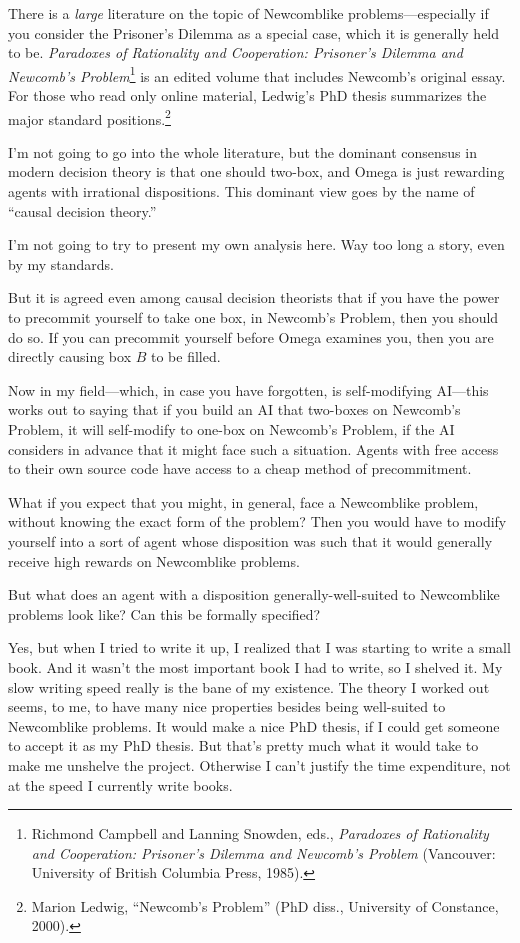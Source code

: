 {
 There is a \textit{large} literature on the topic of Newcomblike
problems---especially if you consider the Prisoner's
Dilemma as a special case, which it is generally held to be.
\textit{Paradoxes of Rationality and Cooperation:
Prisoner's Dilemma and Newcomb's
Problem}\footnote{Richmond Campbell and Lanning Snowden, eds., \textit{Paradoxes
of Rationality and Cooperation: Prisoner's Dilemma and
Newcomb's Problem} (Vancouver: University of British
Columbia Press, 1985).} is an edited volume that includes
Newcomb's original essay. For those who read only
online material, Ledwig's PhD thesis summarizes the
major standard positions.\footnote{Marion Ledwig, ``Newcomb's
Problem'' (PhD diss., University of Constance,
2000).}}


 I'm not going to go into the whole literature, but
the dominant consensus in modern decision theory is that one should
two-box, and Omega is just rewarding agents with irrational
dispositions. This dominant view goes by the name of
``causal decision theory.''


 I'm not going to try to present my own analysis
here. Way too long a story, even by my standards.


 But it is agreed even among causal decision theorists that if you
have the power to precommit yourself to take one box, in
Newcomb's Problem, then you should do so. If you can
precommit yourself before Omega examines you, then you are directly
causing box $B$ to be filled.


 Now in my field---which, in case you have forgotten, is
self-modifying AI---this works out to saying that if you build an AI
that two-boxes on Newcomb's Problem, it will
self-modify to one-box on Newcomb's Problem, if the AI
considers in advance that it might face such a situation. Agents with
free access to their own source code have access to a cheap method of
precommitment.


 What if you expect that you might, in general, face a Newcomblike
problem, without knowing the exact form of the problem? Then you would
have to modify yourself into a sort of agent whose disposition was such
that it would generally receive high rewards on Newcomblike problems.


 But what does an agent with a disposition generally-well-suited to
Newcomblike problems look like? Can this be formally specified?


 Yes, but when I tried to write it up, I realized that I was
starting to write a small book. And it wasn't the most
important book I had to write, so I shelved it. My slow writing speed
really is the bane of my existence. The theory I worked out seems, to
me, to have many nice properties besides being well-suited to
Newcomblike problems. It would make a nice PhD thesis, if I could get
someone to accept it as my PhD thesis. But that's
pretty much what it would take to make me unshelve the project.
Otherwise I can't justify the time expenditure, not at
the speed I currently write books.



